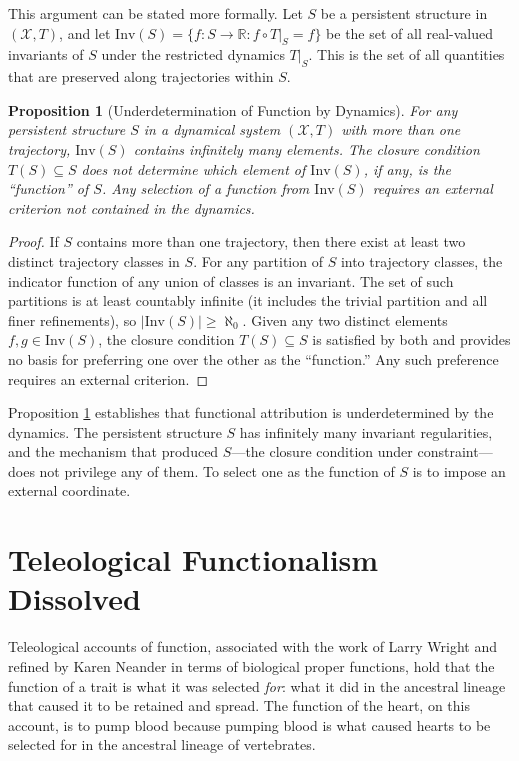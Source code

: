 \documentclass[12pt, a4paper, oneside]{article}
\theoremstyle{plain}
\newtheorem{proposition}[theorem]{Proposition}
\theoremstyle{definition}
\theoremstyle{remark}
\newcommand{\X}{\mathcal{X}}
\newcommand{\T}{T}
\begin{document}
This argument can be stated more formally. Let $S$ be a persistent structure in $(\X, \T)$, and let $\mathrm{Inv}(S) = \{f : S \to \mathbb{R} : f \circ \T|_S = f\}$ be the set of all real-valued invariants of $S$ under the restricted dynamics $\T|_S$. This is the set of all quantities that are preserved along trajectories within $S$.

\begin{proposition}[Underdetermination of Function by Dynamics]
\label{prop:underdetermination}
For any persistent structure $S$ in a dynamical system $(\X, \T)$ with more than one trajectory, $\mathrm{Inv}(S)$ contains infinitely many elements. The closure condition $\T(S) \subseteq S$ does not determine which element of $\mathrm{Inv}(S)$, if any, is the ``function'' of $S$. Any selection of a function from $\mathrm{Inv}(S)$ requires an external criterion not contained in the dynamics.
\end{proposition}

\begin{proof}
If $S$ contains more than one trajectory, then there exist at least two distinct trajectory classes in $S$. For any partition of $S$ into trajectory classes, the indicator function of any union of classes is an invariant. The set of such partitions is at least countably infinite (it includes the trivial partition and all finer refinements), so $|\mathrm{Inv}(S)| \geq \aleph_0$. Given any two distinct elements $f, g \in \mathrm{Inv}(S)$, the closure condition $\T(S) \subseteq S$ is satisfied by both and provides no basis for preferring one over the other as the ``function.'' Any such preference requires an external criterion.
\end{proof}

Proposition \ref{prop:underdetermination} establishes that functional attribution is underdetermined by the dynamics. The persistent structure $S$ has infinitely many invariant regularities, and the mechanism that produced $S$---the closure condition under constraint---does not privilege any of them. To select one as the function of $S$ is to impose an external coordinate.

\section{Teleological Functionalism Dissolved}

Teleological accounts of function, associated with the work of Larry Wright and refined by Karen Neander in terms of biological proper functions, hold that the function of a trait is what it was selected \emph{for}: what it did in the ancestral lineage that caused it to be retained and spread. The function of the heart, on this account, is to pump blood because pumping blood is what caused hearts to be selected for in the ancestral lineage of vertebrates.
\end{document}

